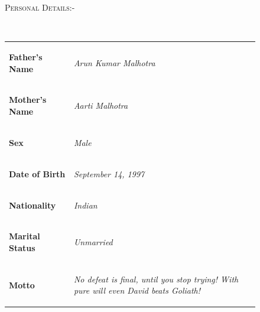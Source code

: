 \documentclass[11pt]{article}
\begin{document}
\begin{figure}[ht]
\flushleft
\noindent\colorbox{WeakOrange}
{\parbox{\dimexpr\textwidth-2\fboxsep\relax}{\textsc{Personal Details:-}}}\\

\begin{tabular}{ |m{5.5cm} m{14cm}| }
\hline
\rowcolor{FaintOrange}
\begin{flushleft}

\textbf{{ Father's Name }}

\end{flushleft}&\begin{center}\textit{ Arun Kumar Malhotra }\end{center}\\

\begin{flushleft}
\textbf{{ Mother's Name }}

\end{flushleft}&\begin{center}\textit{ Aarti Malhotra }\end{center}\\
\rowcolor{FaintOrange}
\begin{flushleft}

\textbf{{ Sex }}

\end{flushleft}&\begin{center}\textit{ Male }\end{center}\\
\begin{flushleft}
\textbf{{ Date of Birth }}

\end{flushleft}&\begin{center}\textit{ September 14, 1997 }\end{center}\\
\rowcolor{FaintOrange}
\begin{flushleft}

\textbf{{ Nationality }}

\end{flushleft}&\begin{center}\textit{ Indian }\end{center}\\
\begin{flushleft}
\textbf{{ Marital Status }}

\end{flushleft}&\begin{center}\textit{ Unmarried }\end{center}\\
\rowcolor{FaintOrange}
\begin{flushleft}

\textbf{{ Motto }}

\end{flushleft}&\begin{center}\textit{ No defeat is final, until you stop trying! With pure will even David beats Goliath! }\end{center}\\

\hline
\end{tabular}
\end{figure}
\end{document}
